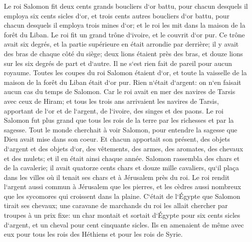 \verse Le roi Salomon fit deux cents grands boucliers d`or battu, pour chacun desquels il employa six cents sicles d`or, 
\verse et trois cents autres boucliers d`or battu, pour chacun desquels il employa trois mines d`or; et le roi les mit dans la maison de la forêt du Liban. 
\verse Le roi fit un grand trône d`ivoire, et le couvrit d`or pur. 
\verse Ce trône avait six degrés, et la partie supérieure en était arrondie par derrière; il y avait des bras de chaque côté du siège; deux lions étaient près des bras, 
\verse et douze lions sur les six degrés de part et d`autre. Il ne s`est rien fait de pareil pour aucun royaume. 
\verse Toutes les coupes du roi Salomon étaient d`or, et toute la vaisselle de la maison de la forêt du Liban était d`or pur. Rien n`était d`argent: on n`en faisait aucun cas du temps de Salomon. 
\verse Car le roi avait en mer des navires de Tarsis avec ceux de Hiram; et tous les trois ans arrivaient les navires de Tarsis, apportant de l`or et de l`argent, de l`ivoire, des singes et des paons. 
\verse Le roi Salomon fut plus grand que tous les rois de la terre par les richesses et par la sagesse. 
\verse Tout le monde cherchait à voir Salomon, pour entendre la sagesse que Dieu avait mise dans son coeur. 
\verse Et chacun apportait son présent, des objets d`argent et des objets d`or, des vêtements, des armes, des aromates, des chevaux et des mulets; et il en était ainsi chaque année. 
\verse Salomon rassembla des chars et de la cavalerie; il avait quatorze cents chars et douze mille cavaliers, qu`il plaça dans les villes où il tenait ses chars et à Jérusalem près du roi. 
\verse Le roi rendit l`argent aussi commun à Jérusalem que les pierres, et les cèdres aussi nombreux que les sycomores qui croissent dans la plaine. 
\verse C`était de l`Égypte que Salomon tirait ses chevaux; une caravane de marchands du roi les allait chercher par troupes à un prix fixe: 
\verse un char montait et sortait d`Égypte pour six cents sicles d`argent, et un cheval pour cent cinquante sicles. Ils en amenaient de même avec eux pour tous les rois des Héthiens et pour les rois de Syrie. 

